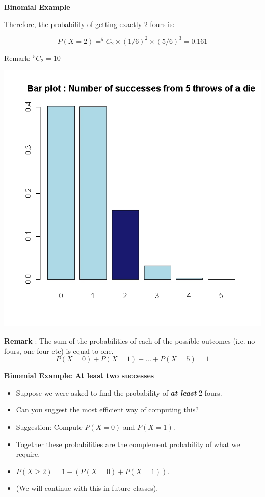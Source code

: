 {\textbf{Binomial Example }

Therefore, the probability of getting exactly 2 fours is:

\[P(X=2) = ^5C_2 \times (1/6)^2 \times (5/6)^3 = 0.161\]

Remark: $^5C_2 = 10$\\


\begin{center}
\includegraphics[scale=0.40]{images/3Bbarplot4}
\end{center}


\textbf{Remark} : The sum of the probabilities of each of the possible outcomes (i.e. no fours, one four etc) is equal to one.
\[P(X=0) + P(X = 1) + \ldots + P(X=5) = 1 \]



\textbf{Binomial Example: At least two successes}
\begin{itemize}
\item Suppose we were asked to find the probability of \textbf{\emph{at least}} 2 fours.
\item Can you suggest the most efficient way of computing this?
\item Suggestion: Compute $P(X=0)$ and $P(X = 1)$.
\item Together these probabilities are the complement probability of what we require.
\item $P(X \geq 2) = 1 - ( P(X=0) + P(X = 1))$.
\item (We will continue with this in future classes).
\end{itemize}

}
